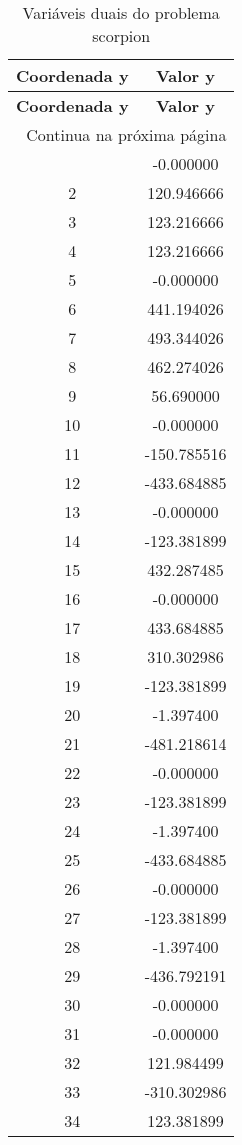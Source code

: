 \documentclass[12pt]{article}
\begin{document}
\begin{longtable}{@{}cc@{}}
\caption{Variáveis duais do problema scorpion} \\
\toprule
\textbf{Coordenada y} & \textbf{Valor y} \\
\midrule
\endfirsthead

\toprule
\textbf{Coordenada y} & \textbf{Valor y} \\
\midrule
\endhead

\midrule \multicolumn{2}{r}{{Continua na próxima página}} \\ \midrule
\endfoot

\bottomrule
\endlastfoot
1 & -0.000000 \\
2 & 120.946666 \\
3 & 123.216666 \\
4 & 123.216666 \\
5 & -0.000000 \\
6 & 441.194026 \\
7 & 493.344026 \\
8 & 462.274026 \\
9 & 56.690000 \\
10 & -0.000000 \\
11 & -150.785516 \\
12 & -433.684885 \\
13 & -0.000000 \\
14 & -123.381899 \\
15 & 432.287485 \\
16 & -0.000000 \\
17 & 433.684885 \\
18 & 310.302986 \\
19 & -123.381899 \\
20 & -1.397400 \\
21 & -481.218614 \\
22 & -0.000000 \\
23 & -123.381899 \\
24 & -1.397400 \\
25 & -433.684885 \\
26 & -0.000000 \\
27 & -123.381899 \\
28 & -1.397400 \\
29 & -436.792191 \\
30 & -0.000000 \\
31 & -0.000000 \\
32 & 121.984499 \\
33 & -310.302986 \\
34 & 123.381899 \\

\end{longtable}
\end{document}
